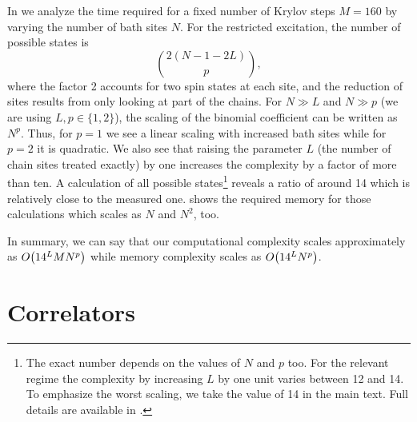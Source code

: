 In 
we analyze the time required for a fixed number of Krylov steps $M=160$ by varying
the number of bath sites $N$.
For the restricted excitation,
the number of possible states is
\begin{equation}
    \binom{2(N-1-2L)}{p},
\end{equation}
where the factor 2 accounts for two spin states at each site,
and the reduction of sites results from only looking at part of the chains.
For $N \gg L$ and $N \gg p$ (we are using $L, p\in\{1,2\}$),
the scaling of the binomial coefficient can be written as $N^p$.
Thus, for $p=1$ we see a linear scaling with increased bath sites while for $p=2$ it is quadratic.
We also see that raising the parameter $L$ (the number of chain sites treated exactly)
by one increases the complexity by a factor of more than ten.
A calculation of all possible states\footnote{
    The exact number depends on the values of $N$ and $p$ too.
    For the relevant regime the complexity by increasing $L$ by one unit varies between 12 and 14.
    To emphasize the worst scaling, we take the value of 14 in the main text.
    Full details are available in .
}
reveals a ratio of around 14 which is relatively close to the measured one.
 shows the required memory for those calculations
which scales as $N$ and $N^2$, too.

In summary, we can say that our computational complexity scales approximately as $O\!\left(14^L M N^p\right)$
while memory complexity scales as $O\!\left(14^L N^p\right)$.

\section{Correlators}

